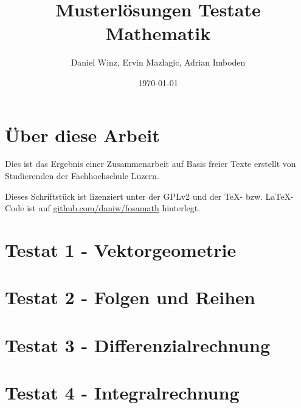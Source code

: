 \documentclass[a4paper,10pt,fleqn]{book}
\title{Musterlösungen Testate Mathematik}
\author{Daniel Winz, Ervin Mazlagic, Adrian Imboden}
\date{\today}
\begin{document}
\maketitle

\chapter*{Über diese Arbeit}
Dies ist das Ergebnis einer Zusammenarbeit auf Basis freier Texte erstellt von Studierenden der Fachhochschule Luzern. 

Dieses Schriftstück ist lizenziert unter der GPLv2 und der \TeX-  bzw. \LaTeX- Code ist auf \url{github.com/daniw/fosamath} hinterlegt.


\tableofcontents
\chapter{Testat 1 - Vektorgeometrie}

\chapter{Testat 2 - Folgen und Reihen}

\chapter{Testat 3 - Differenzialrechnung}

\chapter{Testat 4 - Integralrechnung}

\end{document}
